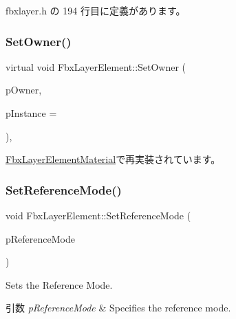  fbxlayer.\+h の 194 行目に定義があります。

\mbox{\label{class_fbx_layer_element_ab4740c4774c0600f91515fb2c022f0ef}} 
\subsubsection{\texorpdfstring{Set\+Owner()}{SetOwner()}}
{\footnotesize\ttfamily virtual void Fbx\+Layer\+Element\+::\+Set\+Owner (\begin{DoxyParamCaption}\item[{\hyperlink{class_fbx_layer_container}{Fbx\+Layer\+Container} $\ast$}]{p\+Owner,  }\item[{int}]{p\+Instance = {} }\end{DoxyParamCaption})\hspace{0.3cm}{\ttfamily [protected]}, {\ttfamily [virtual]}}



\hyperlink{class_fbx_layer_element_material_afe025ea61981c53c05cb97bcd9174631}{Fbx\+Layer\+Element\+Material}で再実装されています。

\mbox{\label{class_fbx_layer_element_a725681d86b87ca356eda6bb681026257}} 
\subsubsection{\texorpdfstring{Set\+Reference\+Mode()}{SetReferenceMode()}}
{\footnotesize\ttfamily void Fbx\+Layer\+Element\+::\+Set\+Reference\+Mode (\begin{DoxyParamCaption}\item[{\hyperlink{class_fbx_layer_element_a00f04654580ca9b2f5d292c11abd83fc}{E\+Reference\+Mode}}]{p\+Reference\+Mode }\end{DoxyParamCaption})\hspace{0.3cm}{\ttfamily [inline]}}

Sets the Reference Mode. 
\begin{DoxyParams}{引数}
{\em p\+Reference\+Mode} & Specifies the reference mode. \\
\hline
\end{DoxyParams}



